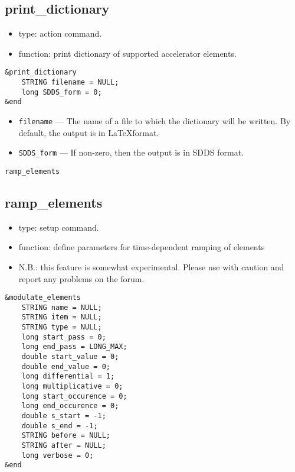 \documentclass[11pt]{article}
\begin{document}
\subsection{print\_dictionary \label{subsec:printdictionary}}

\begin{itemize}
\item type: action command.
\item function: print dictionary of supported accelerator elements.
\end{itemize}

\begin{verbatim}
&print_dictionary
    STRING filename = NULL;
    long SDDS_form = 0;
&end
\end{verbatim}

\begin{itemize}
\item \verb|filename| --- The name of a file to which the dictionary will be written.  By default, the 
  output is in \LaTeX format.
\item \verb|SDDS_form| --- If non-zero, then the output is in  SDDS format.
\end{itemize}

\begin{latexonly}
\newpage
\begin{center}{\Large\verb|ramp_elements|}\end{center}
\end{latexonly}
\subsection{ramp\_elements\label{subsec:rampelements}}

\begin{itemize}
\item type: setup command.
\item function: define parameters for time-dependent ramping of elements
\item N.B.: this feature is somewhat experimental.  Please use with caution and report any problems on the forum.
\end{itemize}

\begin{verbatim}
&modulate_elements
    STRING name = NULL;
    STRING item = NULL;
    STRING type = NULL;
    long start_pass = 0;
    long end_pass = LONG_MAX;
    double start_value = 0;
    double end_value = 0;
    long differential = 1;
    long multiplicative = 0;
    long start_occurence = 0;
    long end_occurence = 0;
    double s_start = -1;
    double s_end = -1;
    STRING before = NULL;
    STRING after = NULL;
    long verbose = 0;
&end
\end{verbatim}
\end{document}
